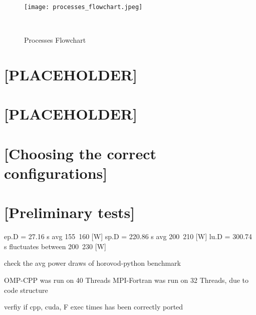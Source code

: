 \begin{figure}[hbtp]
    \centering
    \texttt{[image: processes\_flowchart.jpeg]}
    \caption{Processes Flowchart}~\label{fig:processes_flowchart.jpeg}
\end{figure}

\section{[PLACEHOLDER]}
\section{[PLACEHOLDER]}
\section{[Choosing the correct configurations]}
\section{[Preliminary tests]}














ep.D = 27.16 s          avg 155~160 [W]
sp.D = 220.86 s         avg 200~210 [W]
lu.D = 300.74 s         fluctuates between 200~230 [W]


check the avg power draws of horovod-python benchmark

OMP-CPP was run on 40 Threads
MPI-Fortran was run on 32 Threads, due to code structure

verfiy if cpp, cuda, F exec times has been correctly ported